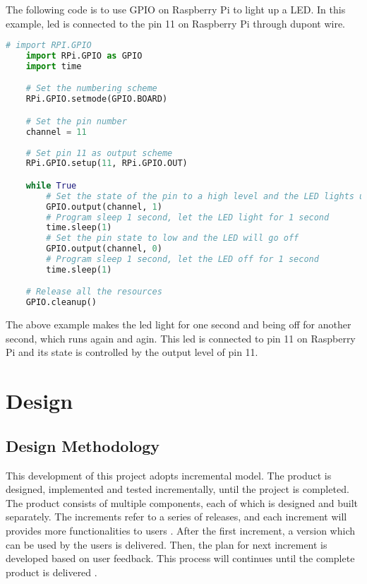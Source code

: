 \documentclass[11pt,times,oneside,openright,hardcopy]{eeereport}
\begin{document}
The following code is to use GPIO on Raspberry Pi to light up a LED.
In this example, led is connected to the pin 11 on Raspberry Pi through dupont wire.
\begin{lstlisting}[language=Python]
    # import RPI.GPIO
    import RPi.GPIO as GPIO  
    import time

    # Set the numbering scheme
    RPi.GPIO.setmode(GPIO.BOARD)

    # Set the pin number
    channel = 11
    
    # Set pin 11 as output scheme
    RPi.GPIO.setup(11, RPi.GPIO.OUT)    

    while True
        # Set the state of the pin to a high level and the LED lights up
        GPIO.output(channel, 1)   
        # Program sleep 1 second, let the LED light for 1 second
        time.sleep(1)   
        # Set the pin state to low and the LED will go off
        GPIO.output(channel, 0) 
        # Program sleep 1 second, let the LED off for 1 second 
        time.sleep(1)  

    # Release all the resources
    GPIO.cleanup()  
\end{lstlisting}
The above example makes the led light for one second and being off for another second, which runs again and agin. 
This led is connected to pin 11 on Raspberry Pi and its state is controlled by the output level of pin 11.


\chapter{Design}
\section{Design Methodology}
This development of this project adopts incremental model. The product is designed, implemented and tested incrementally, until the project is completed. The product consists of multiple components, each of which is designed and built separately.
The increments refer to a series of releases, and each increment will provides more functionalities to users \cite{Bell:2016vq}. After the first increment, a version which can be used by the users is delivered. Then, the plan for next increment is developed based on user feedback.
This process will continues until the complete product is delivered \cite{Bergmann:2010hp}.
\end{document}
